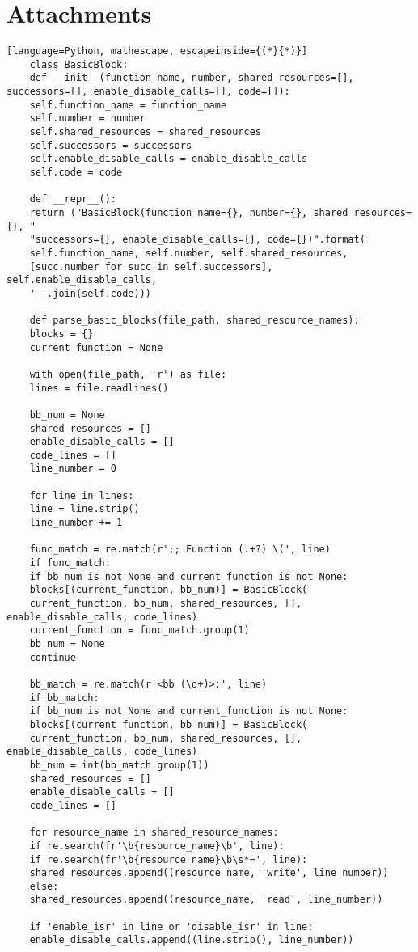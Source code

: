 \documentclass[
fancyheadings, %
%
%
]{stsreprt}
\begin{document}
\chapter{Attachments}
\begin{lstlisting}[language=Python, mathescape, escapeinside={(*}{*)}]
	class BasicBlock:
	def __init__(function_name, number, shared_resources=[], successors=[], enable_disable_calls=[], code=[]):
	self.function_name = function_name
	self.number = number
	self.shared_resources = shared_resources
	self.successors = successors
	self.enable_disable_calls = enable_disable_calls
	self.code = code
	
	def __repr__():
	return ("BasicBlock(function_name={}, number={}, shared_resources={}, "
	"successors={}, enable_disable_calls={}, code={})".format(
	self.function_name, self.number, self.shared_resources, 
	[succ.number for succ in self.successors], self.enable_disable_calls, 
	' '.join(self.code)))
	
	def parse_basic_blocks(file_path, shared_resource_names):
	blocks = {}
	current_function = None
	
	with open(file_path, 'r') as file:
	lines = file.readlines()
	
	bb_num = None
	shared_resources = []
	enable_disable_calls = []
	code_lines = []
	line_number = 0  
	
	for line in lines:
	line = line.strip()
	line_number += 1
	
	func_match = re.match(r';; Function (.+?) \(', line)
	if func_match:
	if bb_num is not None and current_function is not None:
	blocks[(current_function, bb_num)] = BasicBlock(
	current_function, bb_num, shared_resources, [], enable_disable_calls, code_lines)
	current_function = func_match.group(1)
	bb_num = None
	continue
	
	bb_match = re.match(r'<bb (\d+)>:', line)
	if bb_match:
	if bb_num is not None and current_function is not None:
	blocks[(current_function, bb_num)] = BasicBlock(
	current_function, bb_num, shared_resources, [], enable_disable_calls, code_lines)
	bb_num = int(bb_match.group(1))
	shared_resources = []
	enable_disable_calls = []
	code_lines = []
	
	for resource_name in shared_resource_names:
	if re.search(fr'\b{resource_name}\b', line):
	if re.search(fr'\b{resource_name}\b\s*=', line):
	shared_resources.append((resource_name, 'write', line_number))
	else:
	shared_resources.append((resource_name, 'read', line_number))
	
	if 'enable_isr' in line or 'disable_isr' in line:
	enable_disable_calls.append((line.strip(), line_number))
	

\end{lstlisting}
\end{document}
